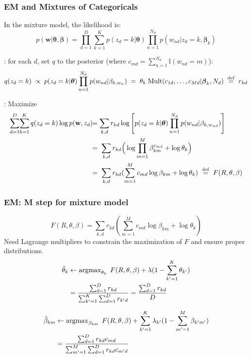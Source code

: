 \begin{frame}
\frametitle{EM and Mixtures of Categoricals}

In the mixture model, the likelihood is: 
\[
\textstyle
p(\mathbf{w}|\boldsymbol{\theta},\boldsymbol{\beta}) = \prod_{d=1}^D \sum_{k=1}^K p(z_d=k|\boldsymbol{\theta}) 
\prod_{n=1}^{N_d} p(w_{nd} | z_d=k, \boldsymbol{\beta}_k) 
\]

: for each  $d$, set $q$ to the posterior (where $c_{md} = \sum_{n=1}^{N_d} \mathbb{I}(w_{nd} = m)$):
{\small
\[
q(z_d = k)\;\propto\;p(z_d=k|\boldsymbol{\theta})\prod_{n=1}^{N_d} p(w_{nd}|\beta_{k,w_n})
\;=\;\theta_k \; \mathrm{Mult}(c_{1d},\ldots,c_{Md}|\boldsymbol{\beta}_k,N_d)\;
\stackrel{\mathrm{def}}{=} \; r_{kd}
\]}

: Maximize
\[
\begin{split}
\sum_{d=1}^D \!\sum_{k=1}^K q(z_d=k)\log p(\mathbf{w}, z_d)\!\!&=\sum_{k,d}
r_{kd}\log \left[  p(z_d=k| \boldsymbol{\theta}) 
\prod_{n=1}^{N_d} p(w_{nd}|\beta_{k,w_{nd}}) \right] \\
&=\;\sum_{k,d} r_{kd}\Big( \log\prod_{m=1}^M
\beta_{km}^{c_{md}}+\log\theta_k\Big)\\
&=\;\sum_{k,d}
r_{kd}(\sum_{m=1}^Mc_{md}\log\beta_{km}+\log\theta_k)
\;\stackrel{\mathrm{def}}{=} \;  F(R,\theta,\beta) 
\end{split}
\]
\end{frame}


\begin{frame}
\frametitle{EM: M step for mixture model}

\[
F(R,\theta,\beta)  = \sum_{k,d}
r_{kd}(\sum_{m=1}^Mc_{md}\log\beta_{km}+\log\theta_k)
\]
Need Lagrange multipliers to constrain the maximization of $F$ and ensure
proper distributions.
\[
\begin{split}
\hat{\theta}_k & \leftarrow \operatorname{argmax}_{\theta_k} \; F(R,\theta,\beta) + \lambda(1-\sum_{k'=1}^K
\theta_{k'})\\
&= \frac{\sum_{d=1}^D r_{kd}}{\sum_{k'=1}^K\sum_{d=1}^D r_{k'd}} = \frac{\sum_{d=1}^D r_{kd}}{D}
\end{split}
\]

\[
\begin{split}
\hat{\beta}_{km} &\leftarrow \operatorname{argmax}_{\beta_{km}} \; F(R,\theta,\beta) + \sum_{k'=1}^K\lambda_{k'}(1-\sum_{m'=1}^M
\beta_{k'm'})\\
&= \frac{\sum_{d=1}^D r_{kd}c_{md}}{\sum_{m'=1}^M\sum_{d=1}^D r_{kd}c_{m'd}}
\end{split}
\]
\end{frame}


